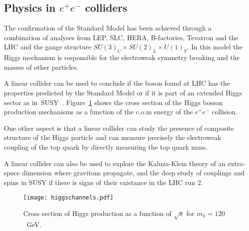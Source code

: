 \subsection{Physics in $e^+e^-$ colliders}
The confirmation of the Standard Model has been achieved through a combination of analyses from LEP, SLC, HERA, B-factories, Tevatron and the LHC and the gauge structure $SU(3)_C\times SU(2)_L\times U(1)_Y$. In this model the Higgs mechanism is responsible for the electroweak symmetry breaking and the masses of other particles.\par
A linear collider can be used to conclude if the boson found at LHC has the properties predicted by the Standard Model or if it is part of an extended Higgs sector as in~SUSY~\cites{Ellis:2008gj,Accomando:2004sz,Assmann:2000hg}. Figure~\ref{f:higgsch} shows the cross section of the Higgs bosson production mechanisms as a function of the c.o.m energy of the $e^+e^-$ collision.\par
One other aspect is that a linear collider can study the presence of composite structure of the Higgs particle and can measure precisely the electroweak coupling of the top quark by directly measuring the top quark mass.\par
A linear collider can also be used to explore the Kaluza-Klein theory of an extra-space dimension where gravitons propagate, and the deep study of couplings and spins in SUSY if there is signs of their existance in the LHC run 2.\par
\begin{figure}[h]
\centering
\texttt{[image: higgschannels.pdf]}\caption{Cross section of Higgs production as a function of $\sqrt{s}$ for $m_h=120$~GeV.}\label{f:higgsch}
\end{figure}
 
